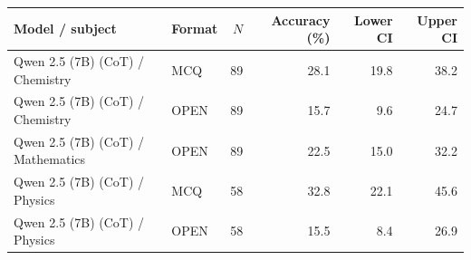 \begin{tabular}{@{}llrrrr@{}}
\toprule
Model / subject & Format & $N$ & Accuracy (\%) & Lower CI & Upper CI \\
\midrule
Qwen 2.5 (7B) (CoT) / Chemistry & MCQ & 89 & 28.1 & 19.8 & 38.2 \\
Qwen 2.5 (7B) (CoT) / Chemistry & OPEN & 89 & 15.7 & 9.6 & 24.7 \\
Qwen 2.5 (7B) (CoT) / Mathematics & OPEN & 89 & 22.5 & 15.0 & 32.2 \\
Qwen 2.5 (7B) (CoT) / Physics & MCQ & 58 & 32.8 & 22.1 & 45.6 \\
Qwen 2.5 (7B) (CoT) / Physics & OPEN & 58 & 15.5 & 8.4 & 26.9 \\
\bottomrule
\end{tabular}
